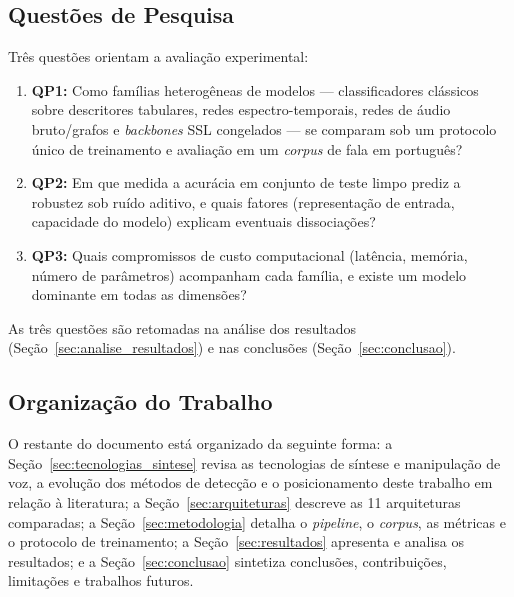 \documentclass[12pt,a4paper]{article}
\begin{document}
\subsection{Questões de Pesquisa}
\label{sec:questoes_pesquisa}

Três questões orientam a avaliação experimental:
\begin{enumerate}
    \item \textbf{QP1:} Como famílias heterogêneas de modelos ---
    classificadores clássicos sobre descritores tabulares, redes
    espectro-temporais, redes de áudio bruto/grafos e \textit{backbones} SSL
    congelados --- se comparam sob um protocolo único de treinamento e
    avaliação em um \textit{corpus} de fala em português?
    \item \textbf{QP2:} Em que medida a acurácia em conjunto de teste limpo
    prediz a robustez sob ruído aditivo, e quais fatores (representação de
    entrada, capacidade do modelo) explicam eventuais dissociações?
    \item \textbf{QP3:} Quais compromissos de custo computacional (latência,
    memória, número de parâmetros) acompanham cada família, e existe um modelo
    dominante em todas as dimensões?
\end{enumerate}
As três questões são retomadas na análise dos resultados
(Seção~\ref{sec:analise_resultados}) e nas conclusões
(Seção~\ref{sec:conclusao}).

\subsection{Organização do Trabalho}

O restante do documento está organizado da seguinte forma: a
Seção~\ref{sec:tecnologias_sintese} revisa as tecnologias de síntese e
manipulação de voz, a evolução dos métodos de detecção e o posicionamento
deste trabalho em relação à literatura; a Seção~\ref{sec:arquiteturas}
descreve as \num{11} arquiteturas comparadas; a Seção~\ref{sec:metodologia}
detalha o \textit{pipeline}, o \textit{corpus}, as métricas e o protocolo de
treinamento; a Seção~\ref{sec:resultados} apresenta e analisa os resultados; e
a Seção~\ref{sec:conclusao} sintetiza conclusões, contribuições, limitações e
trabalhos futuros.

\newpage

\end{document}
